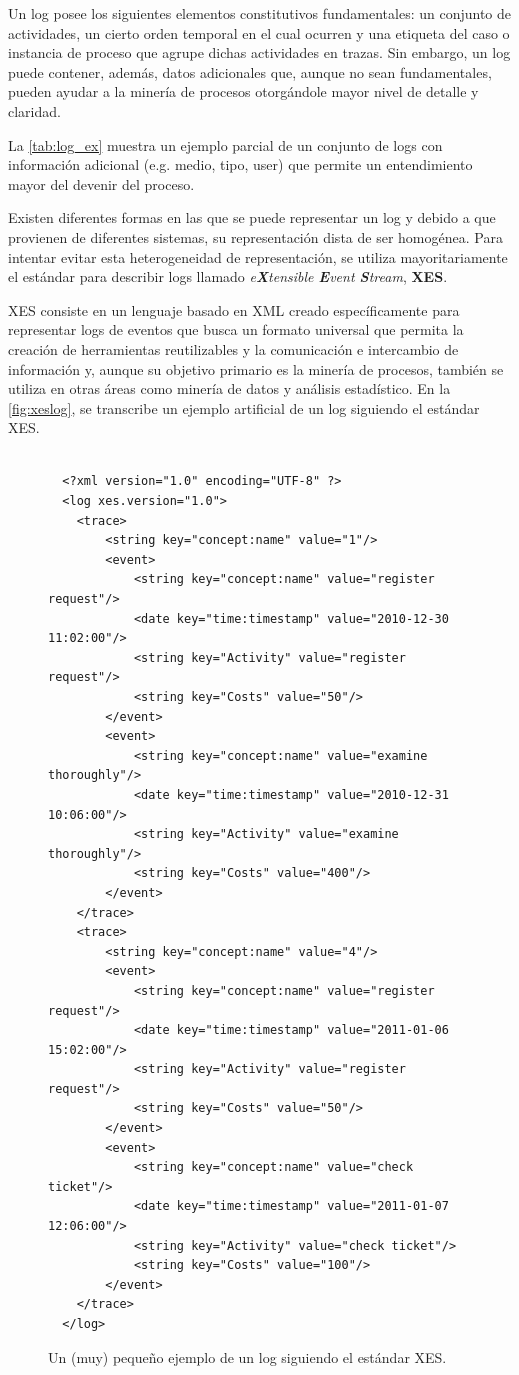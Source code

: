 Un log posee los siguientes elementos constitutivos fundamentales: un conjunto de actividades,
un cierto orden temporal en el cual ocurren y una etiqueta del  caso o instancia de proceso
que agrupe dichas actividades en trazas.
Sin embargo, un log puede contener, además, datos adicionales que, aunque no sean fundamentales, pueden
ayudar a la minería de procesos otorgándole mayor nivel de detalle y claridad.

La \autoref{tab:log_ex} muestra un ejemplo parcial de un conjunto de logs con información 
adicional (e.g. medio, tipo, user) que permite un entendimiento mayor del devenir del proceso.



Existen diferentes formas en las que se puede representar un log y debido a que provienen de diferentes
sistemas, su representación dista de ser homogénea. Para intentar evitar esta heterogeneidad de representación,
se utiliza mayoritariamente el estándar para describir logs llamado 
\textit{e\textbf{X}tensible \textbf{E}vent \textbf{S}tream}, \textbf{XES}.

XES consiste en un lenguaje basado en XML creado específicamente para representar logs de eventos que busca 
un formato universal que permita la creación de herramientas reutilizables y la comunicación e intercambio de 
información y, aunque su objetivo primario es la minería de procesos, también se 
utiliza en otras áreas como minería de datos y análisis estadístico.
En la \autoref{fig:xeslog}, se transcribe un ejemplo artificial de un log siguiendo el estándar XES.

\begin{figure}[h]
    \begin{verbatim}
    
  <?xml version="1.0" encoding="UTF-8" ?>
  <log xes.version="1.0">
  	<trace>
  		<string key="concept:name" value="1"/>
  		<event>
  			<string key="concept:name" value="register request"/>
  			<date key="time:timestamp" value="2010-12-30 11:02:00"/>
  			<string key="Activity" value="register request"/>
  			<string key="Costs" value="50"/>
  		</event>
  		<event>
  			<string key="concept:name" value="examine thoroughly"/>
  			<date key="time:timestamp" value="2010-12-31 10:06:00"/>
  			<string key="Activity" value="examine thoroughly"/>
  			<string key="Costs" value="400"/>
  		</event>
  	</trace>
  	<trace>
  		<string key="concept:name" value="4"/>
  		<event>
  			<string key="concept:name" value="register request"/>
  			<date key="time:timestamp" value="2011-01-06 15:02:00"/>
  			<string key="Activity" value="register request"/>
  			<string key="Costs" value="50"/>
  		</event>
  		<event>
  			<string key="concept:name" value="check ticket"/>
  			<date key="time:timestamp" value="2011-01-07 12:06:00"/>
  			<string key="Activity" value="check ticket"/>
  			<string key="Costs" value="100"/>
  		</event>
  	</trace>
  </log>
    \end{verbatim}
    \caption{Un (muy) pequeño ejemplo de un log siguiendo el estándar XES.}
    \label{fig:xeslog}
\end{figure}

